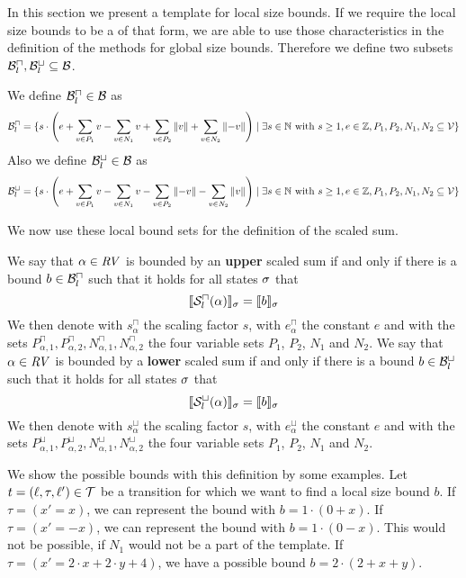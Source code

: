 In this section we present a template for local size bounds.
If we require the local size bounds to be a of that form, we are able to use those characteristics in the definition of the methods for global size bounds.
Therefore we define two subsets $\mathcal{B}^\sqcap_l, \mathcal{B}^\sqcup_l \subseteq \mathcal{B}$.

\begin{definition}
  We define $\mathcal{B}^\sqcap_l \in \mathcal{B}$ as 
  \[ \mathcal{B}^\sqcap_l = \lbrace 
    s \cdot \left(
        e
      + \sum_{v \in P_1} v
      - \sum_{v \in N_1} v
      + \sum_{v \in P_2} \left\Vert v\right\Vert
      + \sum_{v \in N_2} \left\Vert-v\right\Vert
      \right) \mid \exists s \in \mathbb{N} \text{ with } s \geq 1, e \in \mathbb{Z}, P_1, P_2, N_1, N_2 \subseteq \mathcal{V}  \rbrace\]
  Also we define $\mathcal{B}^\sqcup_l \in \mathcal{B}$ as 
  \[ \mathcal{B}^\sqcup_l = \lbrace 
    s \cdot \left(
        e
      + \sum_{v \in P_1} v
      - \sum_{v \in N_1} v
      - \sum_{v \in P_2} \left\Vert-v\right\Vert
      - \sum_{v \in N_2} \left\Vert v\right\Vert
      \right) \mid \exists s \in \mathbb{N} \text{ with } s \geq 1, e \in \mathbb{Z}, P_1, P_2, N_1, N_2 \subseteq \mathcal{V}  \rbrace\]
\end{definition}

We now use these local bound sets for the definition of the scaled sum.

\begin{definition}
  We say that $\alpha \in \mathit{RV}$ is bounded by an \textbf{upper} scaled sum if and only if there is a bound $b \in \mathcal{B}^\sqcap_l$ such that it holds for all states $\sigma$ that
  \[ \llbracket {\mathcal{S}^\sqcap_l}(\alpha) \rrbracket_{\sigma} = \llbracket b \rrbracket_{\sigma} \]
  We then denote with $s^\sqcap_\alpha$ the scaling factor $s$, with $e^\sqcap_\alpha$ the constant $e$ and with the sets $P_{\alpha,1}^\sqcap, P_{\alpha,2}^\sqcap, N_{\alpha,1}^\sqcap, N_{\alpha,2}^\sqcap$ the four variable sets $P_1$, $P_2$, $N_1$ and $N_2$.
  We say that $\alpha \in \mathit{RV}$ is bounded by a \textbf{lower} scaled sum if and only if there is a bound $b \in \mathcal{B}^\sqcup_l$ such that it holds for all states $\sigma$ that
  \[ \llbracket {\mathcal{S}^\sqcup_l}(\alpha) \rrbracket_{\sigma} = \llbracket b \rrbracket_{\sigma} \]
  We then denote with $s^\sqcup_\alpha$ the scaling factor $s$, with $e^\sqcup_\alpha$ the constant $e$ and with the sets $P_{\alpha,1}^\sqcup, P_{\alpha,2}^\sqcup, N_{\alpha,1}^\sqcup, N_{\alpha,2}^\sqcup$ the four variable sets $P_1$, $P_2$, $N_1$ and $N_2$.
\end{definition}

We show the possible bounds with this definition by some examples.
Let $t = (\ell,\tau,\ell') \in \mathcal{T}$ be a transition for which we want to find a local size bound $b$.
If $\tau = (x' = x)$, we can represent the bound with $b = 1 \cdot (0 + x)$.
If $\tau = (x' = -x)$, we can represent the bound with $b = 1 \cdot (0 - x)$.
This would not be possible, if $N_1$ would not be a part of the template.
If $\tau = (x' = 2 \cdot x + 2 \cdot y + 4)$, we have a possible bound $b = 2 \cdot (2 + x + y)$.

